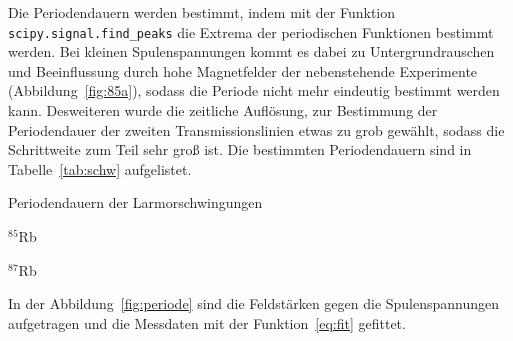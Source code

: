 Die Periodendauern werden bestimmt, indem mit der
Funktion \texttt{scipy.signal.find\_peaks}
die Extrema der periodischen Funktionen bestimmt werden.
Bei kleinen Spulenspannungen kommt es dabei zu Untergrundrauschen und
Beeinflussung durch hohe Magnetfelder der nebenstehende Experimente
(Abbildung~\ref{fig:85a}), sodass die Periode nicht mehr eindeutig
bestimmt werden kann.
Desweiteren wurde die zeitliche Auflösung, zur Bestimmung der Periodendauer
der zweiten Transmissionslinien etwas zu grob gewählt, sodass die
Schrittweite zum Teil sehr groß ist.
Die bestimmten Periodendauern sind in Tabelle~\ref{tab:schw} aufgelistet.
\begin{table}[h]
	\centering
	\caption{Periodendauern der Larmorschwingungen}%
	\label{tab:schw}
	\begin{subtable}[t]{0.4\textwidth}
	\centering
	\caption{$^{85}$Rb}
		
	\end{subtable}
	\begin{subtable}[t]{0.4\textwidth}
	\centering
	\caption{$^{87}$Rb}
		
	\end{subtable}
\end{table}
In der Abbildung~\ref{fig:periode} sind die Feldstärken gegen die Spulenspannungen
aufgetragen und die Messdaten mit der Funktion~\ref{eq:fit} gefittet.
